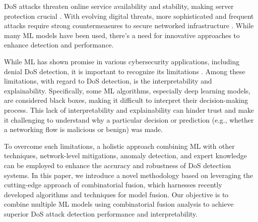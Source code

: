 
DoS attacks threaten online service availability and stability, making server protection crucial \cite{gupta2021distributed}. With evolving digital threats, more sophisticated and frequent attacks require strong countermeasures to secure networked infrastructure \cite{rahouti2021synguard}. While many ML models have been used, there's a need for innovative approaches to enhance detection and performance. %

While ML has shown promise in various cybersecurity applications, including denial DoS detection, it is important to recognize its limitations \cite{mittal2022deep}. Among these limitations, with regard to DoS detection, is the interpretability and explainability. Specifically, some ML algorithms, especially deep learning models, are considered black boxes, making it difficult to interpret their decision-making process. This lack of interpretability and explainability can hinder trust and make it challenging to understand why a particular decision or prediction (e.g., whether a networking flow is malicious or benign) was made.

To overcome such limitations, a holistic approach combining ML with other techniques, network-level mitigations, anomaly detection, and expert knowledge can be employed to enhance the accuracy and robustness of DoS detection systems. In this paper, we introduce a novel methodology based on leveraging the cutting-edge approach of combinatorial fusion, which harnesses recently developed algorithms and techniques for model fusion. Our objective is to combine multiple ML models using combinatorial fusion analysis to achieve superior DoS attack detection performance and interpretability.

